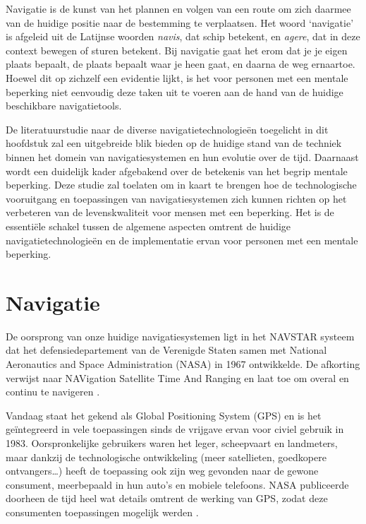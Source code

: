 

Navigatie is de kunst van het plannen en volgen van een route om zich daarmee van de huidige positie naar de bestemming te verplaatsen. Het woord `navigatie' is afgeleid uit de Latijnse woorden \textit{navis}, dat schip betekent, en \textit{agere}, dat in deze context bewegen of sturen betekent. Bij navigatie gaat het erom dat je je eigen plaats bepaalt, de plaats bepaalt waar je heen gaat, en daarna de weg ernaartoe. Hoewel dit op zichzelf een evidentie lijkt, is het voor personen met een mentale beperking niet eenvoudig deze taken uit te voeren aan de hand van de huidige beschikbare navigatietools.

De literatuurstudie naar de diverse navigatietechnologieën toegelicht in dit hoofdstuk zal een uitgebreide blik bieden op de huidige stand van de techniek binnen het domein van navigatiesystemen en hun evolutie over de tijd. Daarnaast wordt een duidelijk kader afgebakend over de betekenis van het begrip mentale beperking. Deze studie zal toelaten om in kaart te brengen hoe de technologische vooruitgang en toepassingen van navigatiesystemen zich kunnen richten op het verbeteren van de levenskwaliteit voor mensen met een beperking. Het is de essentiële schakel tussen de algemene aspecten omtrent de huidige navigatietechnologieën en de implementatie ervan voor personen met een mentale beperking.

\section{Navigatie}
\label{sec:navigatie}

De oorsprong van onze huidige navigatiesystemen ligt in het NAVSTAR systeem dat het defensiedepartement van de Verenigde Staten samen met National Aeronautics and Space Administration (NASA) in 1967 ontwikkelde. De afkorting verwijst naar NAVigation Satellite Time And Ranging en laat toe om overal en continu te navigeren \autocite{Bowditch2002}. 

Vandaag staat het gekend als Global Positioning System (GPS) en is het geïntegreerd in vele toepassingen sinds de vrijgave ervan voor civiel gebruik in 1983. Oorspronkelijke gebruikers waren het leger, scheepvaart en landmeters, maar dankzij de technologische ontwikkeling (meer satellieten, goedkopere ontvangers\ldots) heeft de toepassing ook zijn weg gevonden naar de gewone consument, meerbepaald in hun auto's en mobiele telefoons. NASA publiceerde doorheen de tijd heel wat details omtrent de werking van GPS, zodat deze consumenten toepassingen mogelijk werden \autocite{Zaidman2008}. 

